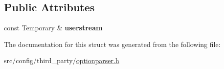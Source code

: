 \subsection*{Public Attributes}
\begin{DoxyCompactItemize}
\item 
\hypertarget{structxmem_1_1config_1_1third__party_1_1_print_usage_implementation_1_1_temporary_writer_ad77042b28c27077df291dae5021a5065}{}const Temporary \& {\bfseries userstream}\label{structxmem_1_1config_1_1third__party_1_1_print_usage_implementation_1_1_temporary_writer_ad77042b28c27077df291dae5021a5065}

\end{DoxyCompactItemize}


The documentation for this struct was generated from the following file\+:\begin{DoxyCompactItemize}
\item 
src/config/third\+\_\+party/\hyperlink{optionparser_8h}{optionparser.\+h}\end{DoxyCompactItemize}
